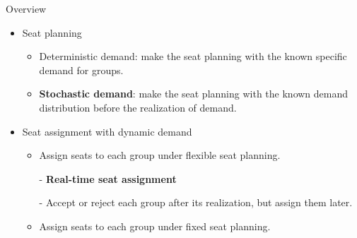     \begin{frame}{Overview}
      \begin{itemize}
        \item Seat planning
        \vspace*{0.2cm}
        \begin{itemize}
          \item {\color{red}Deterministic demand}: make the seat planning with the known specific demand for groups.
          \item {\color{red} \textbf{Stochastic demand}}: make the seat planning with the known demand distribution before the realization of demand.
        \end{itemize}
        
        \item Seat assignment with dynamic demand
        
        \begin{itemize}
          \vspace*{0.2cm}
          \item Assign seats to each group under {\color{red}flexible} seat planning.
          \vspace*{0.2cm}
            \item[-] {\color{red} \textbf{Real-time seat assignment}}
            
            \vspace*{0.2cm}

            \item[-] Accept or reject each group after its realization, but assign them {\color{red}later}.
          \vspace*{0.2cm}
          \item Assign seats to each group under {\color{red}fixed} seat planning.
        \end{itemize}
      \end{itemize}
    \end{frame}

